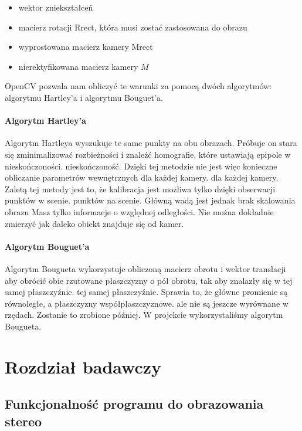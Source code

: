 \documentclass[magisterska]{pracadypl}
\begin{document}
\begin{itemize}
  \item wektor zniekształceń
  \item macierz rotacji Rrect, która musi zostać zastosowana do obrazu
  \item wyprostowana macierz kamery Mrect
  \item nierektyfikowana macierz kamery $M$
\end{itemize}

OpenCV pozwala nam obliczyć te warunki za pomocą dwóch algorytmów: algorytmu Hartley'a
i algorytmu Bouguet'a.

\subsubsection{Algorytm Hartley'a}

Algorytm Hartleya wyszukuje te same punkty na obu obrazach. Próbuje on
stara się zminimalizować rozbieżności i znaleźć homografie, które ustawiają epipole w nieskończoności.
nieskończoność. Dzięki tej metodzie nie jest więc konieczne obliczanie parametrów wewnętrznych dla każdej kamery.
dla każdej kamery.
Zaletą tej metody jest to, że kalibracja jest możliwa tylko dzięki obserwacji punktów w scenie.
punktów na scenie. Główną wadą jest jednak brak skalowania obrazu
Masz tylko informacje o względnej odległości. Nie można dokładnie zmierzyć
jak daleko obiekt znajduje się od kamer.

\subsubsection{Algorytm Bouguet'a}

Algorytm Bougueta wykorzystuje obliczoną macierz obrotu i wektor translacji
aby obrócić obie rzutowane płaszczyzny o pół obrotu, tak aby znalazły się w tej samej płaszczyźnie.
tej samej płaszczyźnie. Sprawia to, że główne promienie są równoległe, a płaszczyzny współpłaszczyznowe.
ale nie są jeszcze wyrównane w rzędach. Zostanie to zrobione później.
W projekcie wykorzystaliśmy algorytm Bougueta.

\chapter{Rozdział badawczy}

\section{Funkcjonalność programu do obrazowania stereo}
\end{document}
